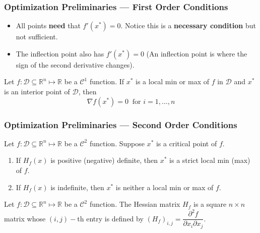 \documentclass[11pt,xcolor={svgnames},aspectratio=169,usepdftitle=false]{beamer}
\begin{document}
\begin{frame}
  \frametitle{Optimization Preliminaries --- First Order Conditions}
\begin{itemize}
  \item All points \alert{\textbf{need}} that $f'(x^*) = 0$. Notice this is a \alert{\textbf{necessary condition}} but not sufficient.
  \item The inflection point also has $f'(x^*) = 0$ {\tiny (An inflection point is where the sign of the second derivative changes)}.
\end{itemize}

\begin{theorem}
Let $f : \mathcal{D}\subseteq\mathbb{R}^n \mapsto \mathbb{R}$ be a $\mathcal{C}^1$ function. If $x^*$ is a local min or max of $f$ in $\mathcal{D}$ and $x^*$ is an interior point of $\mathcal{D}$, then
\[
\nabla f(x^*) = 0 \ \text{ for } i = 1,\ldots, n
\]
\end{theorem}
\end{frame}

\begin{frame}
  \frametitle{Optimization Preliminaries --- Second Order Conditions}
\begin{theorem}
Let $f : \mathcal{D}\subseteq\mathbb{R}^n \mapsto \mathbb{R}$ be a $\mathcal{C}^2$ function. Suppose $x^*$ is a critical point of $f$.
\begin{enumerate}
  \item If $H_f(x)$ is positive (negative) definite, then $x^*$ is a strict local min (max) of $f$.
  \item If $H_f(x)$ is indefinite, then $x^*$ is neither a local min or max of $f$.
\end{enumerate}
\end{theorem}

\begin{definition}
Let $f : \mathcal{D}\subseteq\mathbb{R}^n \mapsto \mathbb{R}$ be a $\mathcal{C}^2$ function. The Hessian matrix $H_f$ is a square $n\times n$ matrix whose $(i,j)-$th entry is defined by $(H_f)_{i,j} = \dfrac{\partial^2 f}{\partial x_i \partial x_j}$.
\end{definition}
\end{frame}
\end{document}
